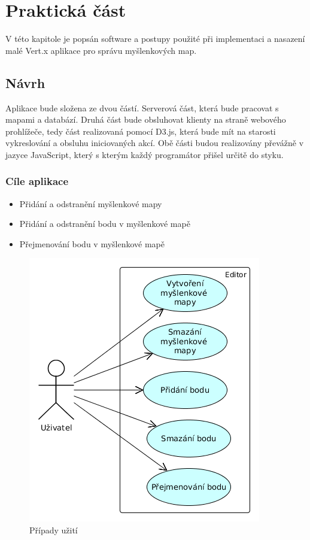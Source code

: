 
\chapter{Praktická část}

V této kapitole je popsán software a postupy použité při implementaci a nasazení malé Vert.x aplikace pro správu myšlenkových map.

\section{Návrh}

Aplikace bude složena ze dvou částí. Serverová část, která bude pracovat s mapami a databází. Druhá část bude obsluhovat klienty na straně webového prohlížeče, tedy část realizovaná pomocí D3.js, která bude mít na starosti vykreslování a obsluhu iniciovaných akcí.	Obě části budou realizovány převážně v jazyce JavaScript, který s kterým každý programátor přišel určitě do styku.

\subsection{Cíle aplikace}\label{sub:use_case}

\begin{itemize}
\item Přidání a odstranění myšlenkové mapy
\item Přidání a odstranění bodu v myšlenkové mapě
\item Přejmenování bodu v myšlenkové mapě
\end{itemize}

\begin{figure}
\begin{centering}
\includegraphics[scale=0.5]{obrazky/use_case}
\par\end{centering}
\caption{Případy užití\label{fig:use_case}}
\end{figure}

